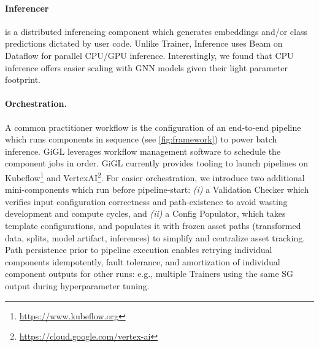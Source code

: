 \paragraph{Inferencer}
is a distributed inferencing component which generates embeddings and/or class predictions dictated by user code. Unlike Trainer, Inference uses Beam on Dataflow for parallel CPU/GPU inference. Interestingly, we found that CPU inference offers easier scaling with GNN models given their light parameter footprint. 

\paragraph{Orchestration.}
A common practitioner workflow is the configuration of an end-to-end pipeline which runs components in sequence (see \cref{fig:framework}) to power batch inference.  
GiGL leverages workflow management software to schedule the component jobs in order. GiGL currently provides tooling to launch pipelines on Kubeflow\footnote{\url{https://www.kubeflow.org}} and VertexAI\footnote{\url{https://cloud.google.com/vertex-ai}}. For easier orchestration, we introduce two additional mini-components which run before pipeline-start: \emph{(i)} a Validation Checker which verifies input configuration correctness and path-existence to avoid wasting development and compute cycles, and \emph{(ii)} a Config Populator, which takes template configurations, and populates it with frozen asset paths (transformed data, splits, model artifact, inferences) to simplify and centralize asset tracking. Path persistence prior to pipeline execution enables retrying individual components idempotently, fault tolerance, and amortization of individual component outputs for other runs: e.g., multiple Trainers using the same SG output during hyperparameter tuning.

